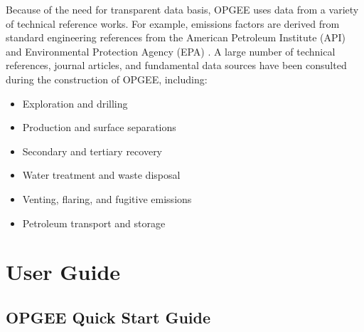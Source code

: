 \documentclass[11pt]{report}
\begin{document}
Because of the need for transparent data basis, OPGEE uses data from a variety of technical reference works. For example, emissions factors are derived from standard engineering references from the American Petroleum Institute (API) and Environmental Protection Agency (EPA) \cite{EPA1995a, Shires2004}. A large number of technical references, journal articles, and fundamental data sources have been consulted during the construction of OPGEE, including: 
\begin{itemize}
\item Exploration and drilling \cite{Shires2004, Azar2007, Devereux1998, Gidley1989, Lapeyrouse2002, Mitchell2006, Mitchell2011, Wilson1999}
\item Production and surface separations \cite{Shires2004, EPA1995, API1991, API1993a, API1995a, API1996b, API1998a, API2003, API2006, API2008a, API2008b, API2009a, API2009b, API2009c, API2009d, Arnold2007, Chilingarian1987, Chilingarian1989, Cholet2000, Clegg2007, Fanchi2007, GPSA2004, Holstein2007a, Holstein2007b, Leffler2006, Manning1991, Manning1995, Stewart2008, Stewart2009, Stewart2011, Takacs1993, Takacs2003}
\item Secondary and tertiary recovery \cite{Craig1993, Jarrell2002, Prats1985, Rose1989, Warner2007, Green1998}
\item Water treatment and waste disposal \cite{Wilson1999, Manning1995, Stewart2011, Khatib2002, Neff2007, Reed1996, Veil2004}
\item Venting, flaring, and fugitive emissions \cite{API1991, API1993a, API1995a, API1996b, API1998a, API1998b, API1998c, API2003, API2006, API2008a, API2008b, API2008c, API2009a, API1993b, API1995a, API2009e}
\item Petroleum transport and storage \cite{API2006, GPSA2004, API1993b, API1995b, API1997, API2009a, Mcallister2009, Miesner2006, Szilas1985}
\end{itemize}

\clearpage


\chapter{User Guide}

\section{OPGEE Quick Start Guide}
\end{document}
